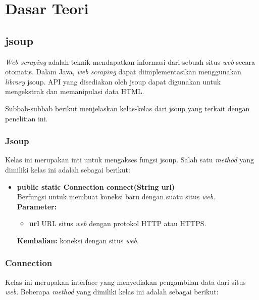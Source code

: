 \chapter{Dasar Teori}
\label{chap:Dasar Teori}

\section{jsoup}
\label{sec:jsoup}

\textit{Web scraping}\cite{Vargiu:2013} adalah teknik mendapatkan informasi dari sebuah situs \textit{web} secara otomatis. Dalam Java, \textit{web scraping} dapat diimplementasikan menggunakan \textit{library} jsoup\cite{jsoup}. API yang disediakan oleh jsoup dapat digunakan untuk mengekstrak dan memanipulasi data HTML. 

Subbab-subbab berikut menjelaskan kelas-kelas dari jsoup yang terkait dengan penelitian ini.

\subsection{Jsoup}

Kelas ini merupakan inti untuk mengakses fungsi jsoup. Salah satu \textit{method} yang dimiliki kelas ini adalah sebagai berikut:
\begin{itemize}
	\item \textbf{public static Connection connect(String url)} \\
		Berfungsi untuk membuat koneksi baru dengan suatu situs \textit{web}. \\
		\textbf{Parameter:}
		\begin{itemize}
			\item \textbf{url} URL situs \textit{web} dengan protokol HTTP atau HTTPS.
		\end{itemize}
		\textbf{Kembalian:} koneksi dengan situs \textit{web}.
\end{itemize}

\subsection{Connection}

Kelas ini merupakan interface yang menyediakan pengambilan data dari situs \textit{web}. Beberapa \textit{method} yang dimiliki kelas ini adalah sebagai berikut:

